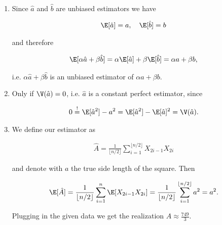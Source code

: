 \begin{solution}

\phantom{}

\begin{enumerate}[label = (\alph*)]
  \item Since $\hat{a}$ and $\hat{b}$ are unbiased estimators we have

  \begin{align*}
    \E[\hat{a}] = a, \quad \E[\hat{b}] = b
  \end{align*}

  and therefore

  \begin{align*}
    \E[\alpha\hat{a} + \beta\hat{b}] = \alpha\E[\hat{a}] + \beta\E[\hat{b}] = \alpha a + \beta b,
  \end{align*}

  i.e. $\alpha\hat{a} + \beta\hat{b}$ is an unbiased estimator of $\alpha a + \beta b$.

  \item Only if $\V(\hat{a}) = 0$, i.e. $\hat{a}$ is a constant perfect estimator, since

  \begin{align*}
    0 \stackrel{!}{=} \E[\hat{a}^2] - a^2 = \E[\hat{a}^2] - \E[\hat{a}]^2 = \V(\hat{a}).
  \end{align*}

  \item We define our estimator as

  \begin{align*}
    \hat{A} = \frac{1}{\lfloor n/2\rfloor}\sum_{i=1}^{\lfloor n/2\rfloor} X_{2i-1}X_{2i}
  \end{align*}

  and denote with $a$ the true side length of the square. Then

  \begin{align*}
    \E[\hat{A}] = \frac{1}{\lfloor n/2\rfloor}\sum_{i=1}^n \E[X_{2i-1}X_{2i}]
    = \frac{1}{\lfloor n/2\rfloor}\sum_{i=1}^{\lfloor n/2\rfloor}a^2 = a^2.
  \end{align*}

  Plugging in the given data we get the realization $A \approx \frac{749}{3}$.
\end{enumerate}

\end{solution}

